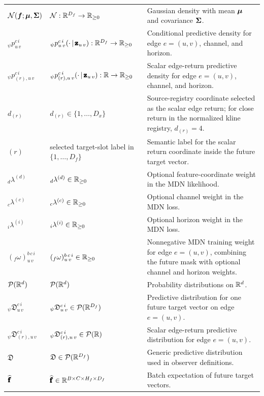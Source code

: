\begin{center}
\begin{longtable}{>{\raggedright\arraybackslash}p{}
                  >{\raggedright\arraybackslash}p{}
                  >{\raggedright\arraybackslash}p{}}
$\mathcal{N}(\bm{f};\bm{\mu},\bm{\Sigma})$ & $\mathcal{N}:\mathbb{R}^{D_f}\rightarrow\mathbb{R}_{\ge 0}$ & Gaussian density with mean $\bm{\mu}$ and covariance $\bm{\Sigma}$. \\
${}_{\psi}p_{u\,v}^{c\,i}$ & ${}_{\psi}p_{u\,v}^{c\,i}(\cdot \,\vert\, \pmb{\mathbf{z}}_{u\,v}):\mathbb{R}^{D_f}\rightarrow\mathbb{R}_{\ge 0}$ & Conditional predictive density for edge $e=(u,v)$, channel, and horizon. \\
${}_{\psi}p_{(r),u\,v}^{c\,i}$ & ${}_{\psi}p_{(r),u\,v}^{c\,i}(\cdot \,\vert\, \pmb{\mathbf{z}}_{u\,v}):\mathbb{R}\rightarrow\mathbb{R}_{\ge 0}$ & Scalar edge-return predictive density for edge $e=(u,v)$, channel, and horizon. \\
$d_{(r)}$ & $d_{(r)}\in\{1,\ldots,D_x\}$ & Source-registry coordinate selected as the scalar edge return; for close return in the normalized kline registry, $d_{(r)}=4$. \\
$(r)$ & selected target-slot label in $\{1,\ldots,D_f\}$ & Semantic label for the scalar return coordinate inside the future target vector. \\
${}_{d}\lambda^{(d)}$ & ${}_{d}\lambda^{(d)}\in\mathbb{R}_{\ge 0}$ & Optional feature-coordinate weight in the MDN likelihood. \\
${}_{c}\lambda^{(c)}$ & ${}_{c}\lambda^{(c)}\in\mathbb{R}_{\ge 0}$ & Optional channel weight in the MDN loss. \\
${}_{i}\lambda^{(i)}$ & ${}_{i}\lambda^{(i)}\in\mathbb{R}_{\ge 0}$ & Optional horizon weight in the MDN loss. \\
$({}_{f}\omega)_{u\,v}^{b\,c\,i}$ & $({}_{f}\omega)_{u\,v}^{b\,c\,i}\in\mathbb{R}_{\ge 0}$ & Nonnegative MDN training weight for edge $e=(u,v)$, combining the future mask with optional channel and horizon weights. \\
\midrule
$\mathcal{P}(\mathbb{R}^d)$ & $\mathcal{P}(\mathbb{R}^d)$ & Probability distributions on $\mathbb{R}^d$. \\
${}_{\psi}\mathfrak{D}_{u\,v}^{c\,i}$ & ${}_{\psi}\mathfrak{D}_{u\,v}^{c\,i} \in \mathcal{P}(\mathbb{R}^{D_f})$ & Predictive distribution for one future target vector on edge $e=(u,v)$. \\
${}_{\psi}\mathfrak{D}_{(r),u\,v}^{c\,i}$ & ${}_{\psi}\mathfrak{D}_{(r),u\,v}^{c\,i} \in \mathcal{P}(\mathbb{R})$ & Scalar edge-return predictive distribution for edge $e=(u,v)$. \\
$\mathfrak{D}$ & $\mathfrak{D} \in \mathcal{P}(\mathbb{R}^{D_f})$ & Generic predictive distribution used in observer definitions. \\
$\widehat{\pmb{\mathbf{f}}}$ & $\widehat{\pmb{\mathbf{f}}} \in \mathbb{R}^{B \times C \times H_f \times D_f}$ & Batch expectation of future target vectors. \\

\end{longtable}
\end{center}
